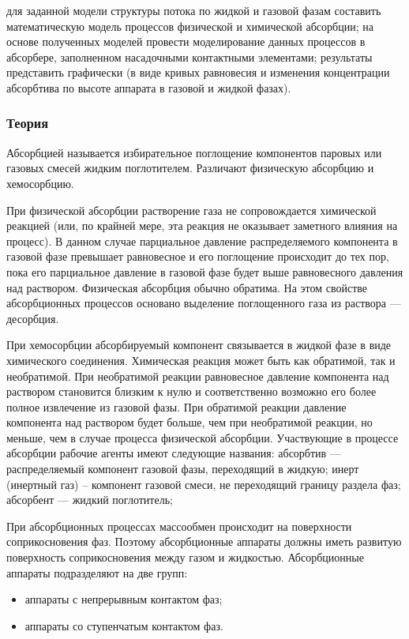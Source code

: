 
\goal для заданной модели структуры потока по жидкой и газовой фазам составить математическую модель процессов физической и химической абсорбции; на основе полученных моделей провести моделирование данных процессов в абсорбере, заполненном насадочными контактными элементами; результаты представить графически (в виде кривых равновесия и изменения концентрации абсорбтива по высоте аппарата в газовой и жидкой фазах).

\subsubsection{Теория}
Абсорбцией называется избирательное поглощение компонентов паровых или газовых смесей жидким поглотителем. Различают физическую абсорбцию и хемосорбцию.

При физической абсорбции растворение газа не сопровождается химической реакцией (или, по крайней мере, эта реакция не оказывает заметного влияния на процесс). В данном случае парциальное давление распределяемого компонента в газовой фазе превышает равновесное и его поглощение происходит до тех пор, пока его парциальное давление в газовой фазе будет выше равновесного давления над раствором. Физическая абсорбция обычно обратима. На этом свойстве абсорбционных процессов основано выделение поглощенного газа из раствора --- десорбция.

При хемосорбции абсорбируемый компонент связывается в жидкой фазе в виде химического соединения. Химическая реакция может быть как обратимой, так и необратимой. При необратимой реакции равновесное давление компонента над раствором становится близким к нулю и соответственно возможно его более полное извлечение из газовой фазы. При обратимой реакции давление компонента над раствором будет больше, чем при необратимой реакции, но меньше, чем в случае процесса физической абсорбции.
Участвующие в процессе абсорбции рабочие агенты имеют следующие названия:
абсорбтив --- распределяемый компонент газовой фазы, переходящий в жидкую;
инерт (инертный газ) -- компонент газовой смеси, не переходящий границу раздела фаз;
абсорбент --- жидкий поглотитель;

При абсорбционных процессах массообмен происходит на поверхности соприкосновения фаз. Поэтому абсорбционные аппараты должны иметь развитую поверхность соприкосновения между газом и жидкостью. Абсорбционные аппараты подразделяют на две групп:
\begin{itemize}
\item аппараты с непрерывным контактом фаз;
\item аппараты со ступенчатым контактом фаз.
\end{itemize}

